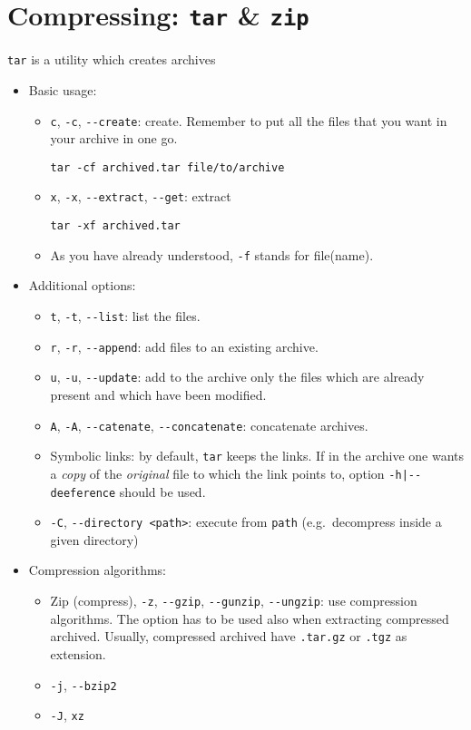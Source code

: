 \documentclass[a4paper,12pt,%
              final%
              ]{article}
\begin{document}
\section{Compressing: \texttt{tar} \& \texttt{zip}}
\texttt{tar} is a utility which creates archives
\begin{itemize}
  \item Basic usage:
    \begin{itemize}
      \item \verb|c|, \verb|-c|, \verb|--create|: create. Remember to put all the files that you want in your archive in one go.
\begin{verbatim}
tar -cf archived.tar file/to/archive
\end{verbatim}
      \item \verb|x|, \verb|-x|, \verb|--extract|, \verb|--get|: extract
\begin{verbatim}
tar -xf archived.tar
\end{verbatim}
      \item As you have already understood, \verb|-f| stands for file(name).
    \end{itemize}
  \item Additional options:
    \begin{itemize}
      \item \verb|t|, \verb|-t|, \verb|--list|: list the files.
      \item \verb|r|, \verb|-r|, \verb|--append|: add files to an existing archive.
      \item \verb|u|, \verb|-u|, \verb|--update|: add to the archive only the files which are already present and which have been modified.
      \item \verb|A|, \verb|-A|, \verb|--catenate|, \verb|--concatenate|: concatenate archives.
      \item Symbolic links: by default, \texttt{tar} keeps the links. If in the archive one wants a \emph{copy} of the \emph{original} file to which the link points to, option \verb!-h|--deeference! should be used.
      \item \verb|-C|, \verb|--directory <path>|: execute from \verb|path| (e.g.~decompress inside a given directory)
    \end{itemize}
  \item Compression algorithms:
    \begin{itemize}
      \item Zip (compress), \verb|-z|, \verb|--gzip|, \verb|--gunzip|, \verb|--ungzip|: use compression algorithms. The option has to be used also when extracting compressed archived. Usually, compressed archived have \verb|.tar.gz| or \verb|.tgz| as extension.
      \item \verb|-j|, \verb|--bzip2|
      \item \verb|-J|, \verb|xz|
    \end{itemize}
\end{itemize}
\end{document}
